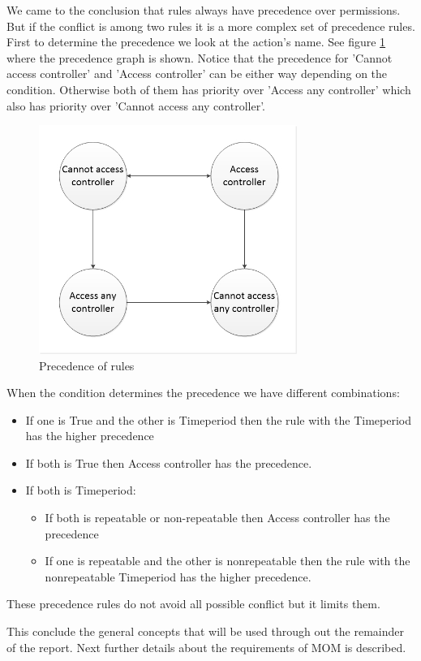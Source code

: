 We came to the conclusion that rules always have precedence over permissions. But if the conflict is among two rules it is a more complex set of precedence rules. First to determine the precedence we look at the action's name. See figure \ref{fig:precendence} where the precedence graph is shown. Notice that the precedence for 'Cannot access controller' and 'Access controller' can be either way depending on the condition. Otherwise both of them has priority over 'Access any controller' which also has priority over 'Cannot access any controller'. 
  
\begin{figure}
	\centering
		\includegraphics[width=0.75\textwidth]{images/precendence.jpg}
	\caption{Precedence of rules}
	\label{fig:precendence}
\end{figure}

When the condition determines the precedence we have different combinations:

\begin{itemize}
	\item If one is True and the other is Timeperiod then the rule with the Timeperiod has the higher precedence
	\item If both is True then Access controller has the precedence.
	\item If both is Timeperiod:
		\begin{itemize}
			\item If both is repeatable or non-repeatable%
			then Access controller has the precedence
			\item If one is repeatable and the other is nonrepeatable then the rule with the nonrepeatable Timeperiod has the higher precedence.
		\end{itemize}
\end{itemize}

These precedence rules do not avoid all possible conflict but it limits them.  


This conclude the general concepts that will be used through out the remainder of the report. Next further details about the requirements of MOM is described.